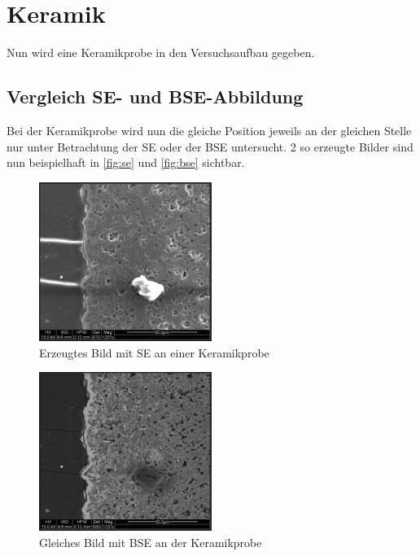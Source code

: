 \documentclass[12pt,english,ngerman]{scrartcl}
\begin{document}
\section{Keramik}

Nun wird eine Keramikprobe in den Versuchsaufbau gegeben.

\subsection{Vergleich SE- und BSE-Abbildung}
Bei der Keramikprobe wird nun die gleiche Position jeweils an der gleichen Stelle nur unter Betrachtung der SE oder der BSE
untersucht. 2 so erzeugte Bilder sind nun beispielhaft in \autoref{fig:se} und \autoref{fig:bse} sichtbar.


\begin{figure}[H]
	\begin{center}
		\includegraphics[width =0.5\textwidth]{./figures/se.png}
	\end{center}
	\caption{Erzeugtes Bild mit SE an einer Keramikprobe}
    \label{fig:se}
\end{figure}

\begin{figure}[H]
	\begin{center}
		\includegraphics[width =0.5\textwidth]{./figures/bse.png}
	\end{center}
	\caption{Gleiches Bild mit BSE an der Keramikprobe}
    \label{fig:bse}
\end{figure}
\end{document}
